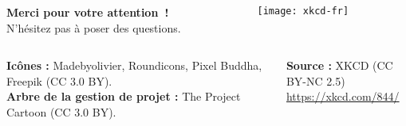 \begin{frame}
    \begin{columns}
        \begin{column}{.65\textwidth}
            \begin{center}
                \LARGE
                \textbf{Merci pour votre attention~!}\\
                \Large
                N’hésitez pas à poser des questions.
            \end{center}
        \end{column}%
        \begin{column}{.35\textwidth}
            \hfill
            \texttt{[image: xkcd-fr]}
        \end{column}
    \end{columns}
    \vfill
    \begin{columns}
        \begin{column}{.65\textwidth}
            {\scriptsize \textbf{Icônes :} Madebyolivier, Roundicons, Pixel Buddha, Freepik (CC 3.0 BY).}\\[-.3em]
            {\scriptsize \textbf{Arbre de la gestion de projet :} The Project Cartoon (CC 3.0 BY).}
        \end{column}%
        \begin{column}{.35\textwidth}
            \hfill{\scriptsize \textbf{Source :} XKCD (CC BY-NC 2.5)}\\[-.3em]
            \hfill{\scriptsize\url{https://xkcd.com/844/}}
        \end{column}
    \end{columns}
\end{frame}
